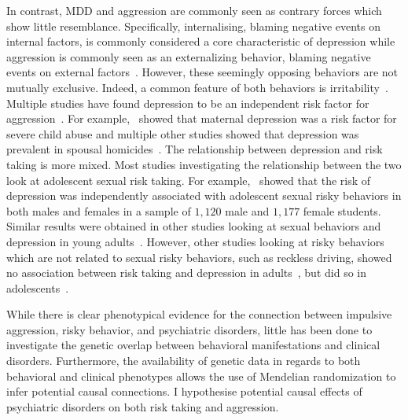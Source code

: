 In contrast, MDD and aggression are commonly seen as contrary forces which show little resemblance.
Specifically, internalising, blaming negative events on internal factors, is commonly considered a core characteristic of depression while aggression is commonly seen as an externalizing behavior, blaming negative events on external factors~\cite{APA1994,AmericanPsychiatricAssociation2013}.
However, these seemingly opposing behaviors are not mutually exclusive. 
Indeed, a common feature of both behaviors is irritability~\cite{Dutton2013}.
Multiple studies have found depression to be an independent risk factor for aggression~\cite{Sher2005,Roland2002,Taft2009, Dutton2013}.
For example,~\citet{Windham2004} showed that maternal depression was a risk factor for severe child abuse and multiple other studies showed that depression was prevalent in spousal homicides~\cite{Stith2004}.
The relationship between depression and risk taking is more mixed.
Most studies investigating the relationship between the two look at adolescent sexual risk taking.
For example,~\citet{Wilson2010} showed that the risk of depression was independently associated with adolescent sexual risky behaviors in both males and females in a sample of $1,120$ male and $1,177$ female students.
Similar results were obtained in other studies looking at sexual behaviors and depression in young adults~\cite{Auerbach2010,Auerbach2007,Othieno2015}.
However, other studies looking at risky behaviors which are not related to sexual risky behaviors, such as reckless driving, showed no association between risk taking and depression in adults~\cite{Vassallo2008}, but did so in adolescents~\cite{McDonald2014}. 

While there is clear phenotypical evidence for the connection between impulsive aggression, risky behavior, and psychiatric disorders, little has been done to investigate the genetic overlap between behavioral manifestations and clinical disorders.
Furthermore, the availability of genetic data in regards to both behavioral and clinical phenotypes allows the use of Mendelian randomization to infer potential causal connections.
I hypothesise potential causal effects of psychiatric disorders on both risk taking and aggression.
